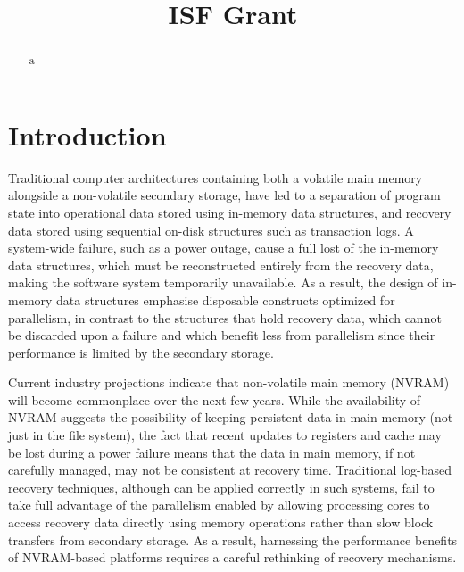 \documentclass{article}
\title{ISF Grant}
\author{}
\begin{document}
\maketitle

\begin{abstract}
	a
\end{abstract}

\section{Introduction}

Traditional computer architectures containing both a volatile main memory alongside a non-volatile secondary storage, have led to a separation of program state into operational data stored using in-memory data structures, and recovery data stored using sequential on-disk structures such as transaction logs. A system-wide failure, such as a power outage, cause a full lost of the in-memory data structures, which must be reconstructed entirely from the recovery data, making the software system temporarily unavailable. As a result, the design of in-memory data structures emphasise disposable constructs optimized for parallelism, in contrast to the structures that hold recovery data, which cannot be discarded upon a failure and which benefit less from parallelism since their performance is limited by the secondary storage.

Current industry projections indicate that non-volatile main memory (NVRAM) will become commonplace over the next few years. While the availability of NVRAM suggests the possibility of keeping persistent data in main memory (not just in the file system), the fact that recent updates to registers and cache may be lost during a power failure means that the data in main memory, if not carefully managed, may not be consistent at recovery time.
Traditional log-based recovery techniques, although can be applied correctly in such systems, fail to take full advantage of the parallelism enabled by allowing processing cores to access recovery data directly using memory operations rather than slow block transfers from secondary storage. As a result, harnessing the performance benefits of NVRAM-based platforms requires a careful rethinking of recovery mechanisms.
\end{document}
